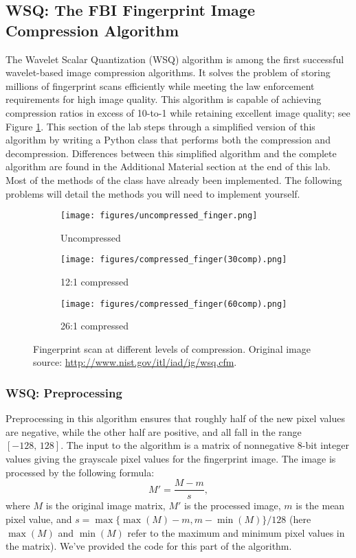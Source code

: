 
\subsection*{WSQ: The FBI Fingerprint Image Compression Algorithm} %

The Wavelet Scalar Quantization (WSQ) algorithm is among the first successful wavelet-based image compression algorithms.
It solves the problem of storing millions of fingerprint scans efficiently while meeting the law enforcement requirements for high image quality.
This algorithm is capable of achieving compression ratios in excess of 10-to-1 while retaining excellent image quality; see Figure \ref{fig:finger_compression}.
This section of the lab steps through a simplified version of this algorithm by writing a Python class that performs both the compression and decompression.
Differences between this simplified algorithm and the complete algorithm are found in the Additional Material section at the end of this lab.
Most of the methods of the class have already been implemented.
The following problems will detail the methods you will need to implement yourself.

\begin{figure}[H]
\centering
\begin{subfigure}{.32\textwidth}
  \centering
  \texttt{[image: figures/uncompressed\_finger.png]}
  \caption{Uncompressed}
\end{subfigure}%
\begin{subfigure}{.32\textwidth}
  \centering
  \texttt{[image: figures/compressed\_finger(30comp).png]}
  \caption{12:1 compressed}
\end{subfigure}%
\begin{subfigure}{.32\textwidth}
  \centering
  \texttt{[image: figures/compressed\_finger(60comp).png]}
  \caption{26:1 compressed}
\end{subfigure}
\caption{Fingerprint scan at different levels of compression.
Original image source: \url{http://www.nist.gov/itl/iad/ig/wsq.cfm}.
}
\label{fig:finger_compression}
\end{figure}

\subsubsection*{WSQ: Preprocessing}
Preprocessing in this algorithm ensures that roughly half of the new pixel values are negative, while the other half are positive, and all fall in the range $[-128,\,128]$.
The input to the algorithm is a matrix of nonnegative 8-bit integer values giving the grayscale pixel values for the fingerprint image.
The image is processed by the following formula:
\[
M' = \frac{M-m}{s},
\]
where $M$ is the original image matrix, $M'$ is the processed image, $m$ is the mean pixel value, and $s = \max\{\max(M) - m, m - \min(M)\}/128$
(here $\max(M)$ and $\min(M)$ refer to the maximum and minimum pixel values in the matrix). We've provided the code for this part of the algorithm.



